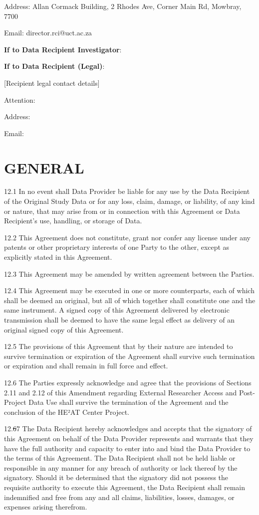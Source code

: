 \documentclass[12pt,letterpaper]{article}
\newcommand{\deleted}[1]{\textcolor{deletecolor}{\sout{#1}}}
\newcommand{\added}[1]{\textcolor{addcolor}{#1}}
\begin{document}
Address: Allan Cormack Building, 2 Rhodes Ave, Corner Main Rd, Mowbray, 7700

Email: director.rci@uct.ac.za

\textbf{If to Data Recipient Investigator}:

\textbf{If to Data Recipient (Legal)}:

[Recipient legal contact details]

Attention:

Address:

Email:

\section{GENERAL}

12.1 In no event shall Data Provider be liable for any use by the Data Recipient of the Original Study Data or for any loss, claim, damage, or liability, of any kind or nature, that may arise from or in connection with this Agreement or Data Recipient's use, handling, or storage of Data.

12.2 This Agreement does not constitute, grant nor confer any license under any patents or other proprietary interests of one Party to the other, except as explicitly stated in this Agreement.

12.3 This Agreement may be amended by written agreement between the Parties.

12.4 This Agreement may be executed in one or more counterparts, each of which shall be deemed an original, but all of which together shall constitute one and the same instrument. A signed copy of this Agreement delivered by electronic transmission shall be deemed to have the same legal effect as delivery of an original signed copy of this Agreement.

12.5 The provisions of this Agreement that by their nature are intended to survive termination or expiration of the Agreement shall survive such termination or expiration and shall remain in full force and effect.

\added{12.6 The Parties expressly acknowledge and agree that the provisions of Sections 2.11 and 2.12 of this Amendment regarding External Researcher Access and Post-Project Data Use shall survive the termination of the Agreement and the conclusion of the HE²AT Center Project.}

12.\deleted{6}\added{7} The Data Recipient hereby acknowledges and accepts that the signatory of this Agreement on behalf of the Data Provider represents and warrants that they have the full authority and capacity to enter into and bind the Data Provider to the terms of this Agreement. The Data Recipient shall not be held liable or responsible in any manner for any breach of authority or lack thereof by the signatory. Should it be determined that the signatory did not possess the requisite authority to execute this Agreement, the Data Recipient shall remain indemnified and free from any and all claims, liabilities, losses, damages, or expenses arising therefrom.
\end{document}
